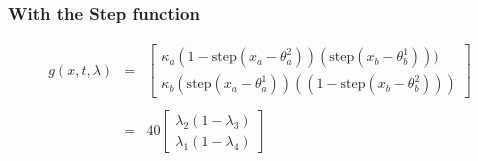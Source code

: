\documentclass{article}
\begin{document}
\subsubsection*{With the Step function}
\begin{equation}
  \label{eq:g1step}
  \begin{array}{lcl}
  g(x,t,\lambda) &=&  \left[
    \begin{array}{l}
      \kappa_a      (1- \mbox{step}( x_a - \theta_a^2))( \mbox{step}( x_b - \theta_b^1)))\\
      \kappa_b      (\mbox{step}( x_a - \theta_a^1))((1- \mbox{step}( x_b - \theta_b^2)))
    \end{array}
  \right]\\ \\
  &=& 40   \left[
    \begin{array}{l}
          \lambda_2 (1-\lambda_3)\\
          \lambda_1 (1-\lambda_4)
    \end{array}
  \right]
\end{array}
\end{equation}
\end{document}
